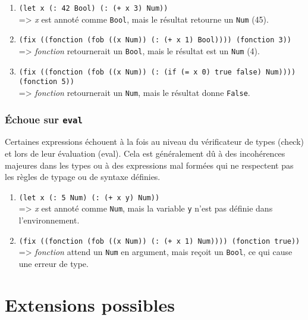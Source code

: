 \documentclass[a4paper,12pt]{article}
\begin{document}
        \begin{enumerate}
            \item \texttt{(let x (: 42 Bool) (: (+ x 3) Num))} \\[.5em]
            => \textit{x} est annoté comme \texttt{Bool}, mais le résultat retourne un \texttt{Num} (45).
        
            \item \texttt{(fix ((fonction (fob ((x Num)) (: (+ x 1) Bool)))) (fonction 3))} \\[.5em]
            => \textit{fonction} retournerait un \texttt{Bool}, mais le résultat est un \texttt{Num} (4).
        
            \item \texttt{(fix ((fonction (fob ((x Num)) (: (if (= x 0) true false) Num)))) (fonction 5))} \\[.5em]
            => \textit{fonction} retournerait un \texttt{Num}, mais le résultat donne \texttt{False}.
        \end{enumerate}

        \subsubsection{Échoue sur \texttt{eval}}
        Certaines expressions échouent à la fois au niveau du vérificateur de types (check) et lors de leur évaluation (eval). 
        Cela est généralement dû à des incohérences majeures dans les types ou à des expressions mal formées qui ne respectent pas 
        les règles de typage ou de syntaxe définies. \\
        \begin{enumerate}
            \item \texttt{(let x (: 5 Num) (: (+ x y) Num))} \\[.5em]
            => \textit{x} est annoté comme \texttt{Num}, mais la variable \texttt{y} n'est pas définie dans l'environnement.
        
            \item \texttt{(fix ((fonction (fob ((x Num)) (: (+ x 1) Num)))) (fonction true))} \\[.5em]
            => \textit{fonction} attend un \texttt{Num} en argument, mais reçoit un \texttt{Bool}, ce qui cause une erreur de type.
        \end{enumerate}



\newpage
\section{Extensions possibles}
\end{document}
